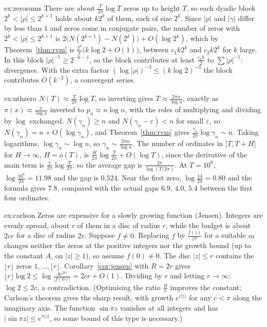 \begin{solution}{ex:zerosums}
\idea There are about $\frac T{2\pi}\log T$ zeros up to height $T$, so each dyadic block $2^k<|\rho|\le2^{k+1}$ holds about $k2^k$ of them, each of size $2^k$.
\writeup Since $|\rho|$ and $|\gamma|$ differ by less than $1$ and zeros come in conjugate pairs, the number of zeros with $2^k<|\rho|\le2^{k+1}$ is $2\bigl(N(2^{k+1})-N(2^k)\bigr)+O(\log2^k)$, which by
Theorem~\ref{thm:rvm} is $\frac{2^k}\pi\bigl(k\log2+O(1)\bigr)$, between $c_1k2^k$ and $c_2k2^k$ for $k$ large. In this block $|\rho|^{-1}\ge2^{-k-1}$, so the block contributes at least $\frac{c_1k}2$ to $\sum|\rho|^{-1}$:
divergence. With the extra factor $(\log|\rho|)^{-3}\le(k\log2)^{-3}$ the block contributes $O(k^{-2})$, a convergent series.
\end{solution}

\begin{solution}{ex:nthzero}
\idea $N(T)\approx\frac T{2\pi}\log T$, so inverting gives $T\approx\frac{2\pi n}{\log n}$, exactly as $\pi(x)\approx\frac x{\log x}$ inverted to $p_n\approx n\log n$, with the roles of multiplying and
dividing by $\log$ exchanged.
\writeup $N(\gamma_n)\ge n$ and $N(\gamma_n-\varepsilon)<n$ for small $\varepsilon$, so $N(\gamma_n)=n+O(\log\gamma_n)$, and Theorem~\ref{thm:rvm} gives $\frac{\gamma_n}{2\pi}\log\gamma_n\sim n$. Taking logarithms,
$\log\gamma_n\sim\log n$, so $\gamma_n\sim\frac{2\pi n}{\log n}$. The number of ordinates in $]T,T+H]$ for $H\to\infty$, $H=o(T)$, is $\frac H{2\pi}\log\frac T{2\pi}+O(\log T)$, since the derivative of the main term is
$\frac1{2\pi}\log\frac T{2\pi}$; so the average gap is $\frac{2\pi}{\log(T/2\pi)}$. At $T=10^6$, $\log\frac{10^6}{2\pi}=11.98$ and the gap is $0.524$.
Near the first zero, $\log\frac{14}{2\pi}=0.80$ and the formula gives $7.8$, compared with the actual gaps $6.9$, $4.0$, $5.4$ between the first four ordinates.
\end{solution}

\begin{solution}{ex:carlson}
\idea Zeros are expensive for a slowly growing function (Jensen). Integers are evenly spread, about $r$ of them in a disc of radius $r$, while the budget is about $2cr$ for a disc of
radius $2r$.
\writeup Suppose $f\ne0$. Replacing $f$ by $\frac{f(z)}{z^m}$ for a suitable $m$ changes neither the zeros at the positive integers nor the growth bound (up to the constant $A$, on $|z|\ge1$), so
assume $f(0)\ne0$. The disc $|z|\le r$ contains the $\lfloor r\rfloor$ zeros $1,\dots,\lfloor r\rfloor$. Corollary~\ref{cor:jensen} with $R=2r$ gives $\lfloor r\rfloor\log2\le\log\frac{Ae^{2cr}}{|f(0)|}=2cr+O(1)$. Dividing
by $r$ and letting $r\to\infty$: $\log2\le2c$, a contradiction. (Optimising the ratio $\frac Rr$ improves the constant; Carlson's theorem gives the sharp result, with growth $e^{c|z|}$ for any $c<\pi$ along the
imaginary axis. The function $\sin\pi z$ vanishes at all integers and has $|\sin\pi z|\le e^{\pi|z|}$, so some bound of this type is necessary.)
\end{solution}

